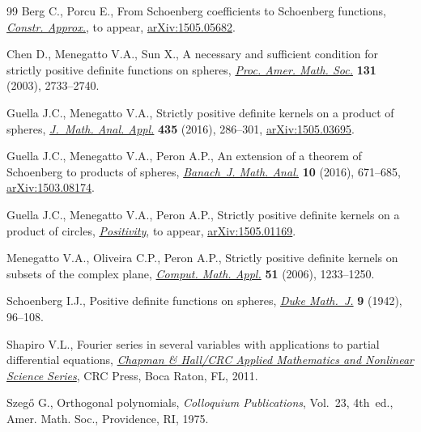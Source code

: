 \documentclass[11pt]{article}
\numberwithin{equation}{section}
\begin{document}
\begin{thebibliography}{99}
Berg C., Porcu E., From Schoenberg coef\/f\/icients to Schoenberg functions,
 \href{http://dx.doi.org/10.1007/s00365-016-9323-9}{\textit{Constr. Approx.}}, {t}o appear, \href{http://arxiv.org/abs/1505.05682}{arXiv:1505.05682}.

Chen D., Menegatto V.A., Sun X., A necessary and suf\/f\/icient condition for
 strictly positive def\/inite functions on spheres, \href{http://dx.doi.org/10.1090/S0002-9939-03-06730-3}{\textit{Proc. Amer. Math.
 Soc.}} \textbf{131} (2003), 2733--2740.

Guella J.C., Menegatto V.A., Strictly positive def\/inite kernels on a product of
 spheres, \href{http://dx.doi.org/10.1016/j.jmaa.2015.10.026}{\textit{J.~Math. Anal. Appl.}} \textbf{435} (2016), 286--301,
 \href{http://arxiv.org/abs/1505.03695}{arXiv:1505.03695}.

Guella J.C., Menegatto V.A., Peron A.P., An extension of a theorem of
 {S}choenberg to products of spheres, \href{http://dx.doi.org/10.1215/17358787-3649260}{\textit{Banach~J. Math. Anal.}}
 \textbf{10} (2016), 671--685, \href{http://arxiv.org/abs/1503.08174}{arXiv:1503.08174}.

Guella J.C., Menegatto V.A., Peron A.P., Strictly positive def\/inite kernels on
 a product of circles, \href{http://dx.doi.org/10.1007/s11117-016-0425-1}{\textit{Positivity}}, {t}o appear, \href{http://arxiv.org/abs/1505.01169}{arXiv:1505.01169}.


Menegatto V.A., Oliveira C.P., Peron A.P., Strictly positive def\/inite kernels
 on subsets of the complex plane, \href{http://dx.doi.org/10.1016/j.camwa.2006.04.006}{\textit{Comput. Math. Appl.}} \textbf{51}
 (2006), 1233--1250.

Schoenberg I.J., Positive def\/inite functions on spheres, \href{http://dx.doi.org/10.1215/S0012-7094-42-00908-6}{\textit{Duke Math.~J.}}
 \textbf{9} (1942), 96--108.

Shapiro V.L., Fourier series in several variables with applications to partial
 dif\/ferential equations, \href{http://dx.doi.org/10.1201/b10811}{\textit{Chapman {\rm \&} Hall/CRC Applied Mathematics and Nonlinear
 Science Series}}, CRC Press, Boca Raton, FL, 2011.

Szeg{\H{o}} G., Orthogonal polynomials, \textit{Colloquium Publications},
 Vol.~23, 4th~ed., Amer. Math. Soc., Providence, RI, 1975.

\end{thebibliography}
\end{document}
